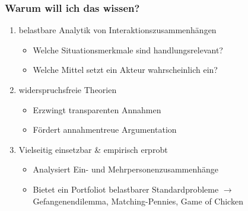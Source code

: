 \documentclass{beamer}
\begin{document}
\begin{frame}
  \frametitle{Warum will ich das wissen?}
  \begin{enumerate}
    \item belastbare Analytik von Interaktionszusammenhängen
    \begin{itemize}
      \item Welche Situationsmerkmale sind handlungsrelevant?
      \item Welche Mittel setzt ein Akteur wahrscheinlich ein?
    \end{itemize}
    \item widerspruchsfreie Theorien
    \begin{itemize}
      \item Erzwingt transparenten Annahmen
      \item Fördert annahmentreue Argumentation
    \end{itemize}
    \item Vielseitig einsetzbar \& empirisch erprobt
    \begin{itemize}
      \item Analysiert Ein- und Mehrpersonenzusammenhänge
      \item Bietet ein Portfoliot belastbarer Standardprobleme\newline
        $\rightarrow$ Gefangenendilemma, Matching-Pennies, Game of Chicken
    \end{itemize}
  \end{enumerate}
\end{frame}
\end{document}

